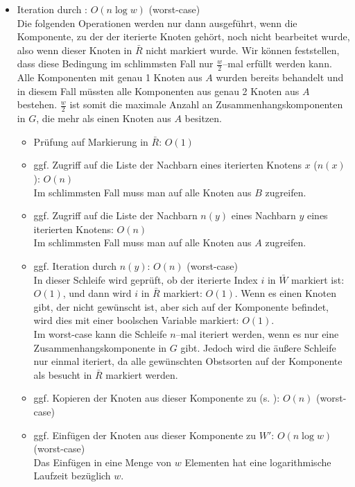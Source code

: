 \begin{itemize}
\begin{itemize}
    \item Iteration durch : $O(n \log w)$ (worst-case)\\
    Die folgenden Operationen werden nur dann ausgeführt, wenn die Komponente,
    zu der der iterierte Knoten gehört, noch nicht bearbeitet wurde, also 
    wenn dieser Knoten in $\bar{R}$ nicht markiert wurde. Wir können feststellen, 
    dass diese Bedingung im schlimmsten Fall nur $\frac{w}{2}$--mal erfüllt werden kann.
    Alle Komponenten mit genau 1 Knoten aus $A$ wurden bereits behandelt und in diesem
    Fall müssten alle Komponenten aus genau 2 Knoten aus $A$ bestehen.
    $\frac{w}{2}$ ist somit die maximale Anzahl an Zusammenhangskomponenten in $G$,
    die mehr als einen Knoten aus $A$ besitzen.
    \begin{itemize}
    \item Prüfung auf Markierung in $\bar{R}$: $O(1)$

    \item ggf. Zugriff auf die Liste der Nachbarn eines iterierten Knotens $x$ ($n(x)$): $O(n)$\\
    Im schlimmsten Fall muss man auf alle Knoten aus $B$ zugreifen.

    \item ggf. Zugriff auf die Liste der Nachbarn $n(y)$ eines Nachbarn $y$ eines iterierten Knotens: $O(n)$\\
    Im schlimmsten Fall muss man auf alle Knoten aus $A$ zugreifen.

    \item ggf. Iteration durch $n(y)$: $O(n)$ (worst-case)\\
    In dieser Schleife wird geprüft, ob der iterierte Index $i$ in $\bar{W}$ markiert ist: $O(1)$,
    und dann wird $i$ in $\bar{R}$ markiert: $O(1)$. Wenn es einen Knoten gibt, der nicht gewünscht ist,
    aber sich auf der Komponente befindet, wird dies mit einer boolschen Variable  markiert: $O(1)$.\\
    Im worst-case kann die Schleife $n$--mal iteriert werden, wenn es nur eine Zusammenhangskomponente
    in $G$ gibt. Jedoch wird die äußere Schleife nur einmal iteriert, da alle gewünschten 
    Obstsorten auf der Komponente als besucht in $\bar{R}$ markiert werden.
    \item ggf. Kopieren der Knoten aus dieser Komponente zu  (s. ): $O(n)$ (worst-case)

    \item ggf. Einfügen der Knoten aus dieser Komponente zu $W'$: $O(n \log w)$ (worst-case)\\
    Das Einfügen in eine Menge von $w$ Elementen hat eine logarithmische Laufzeit bezüglich $w$.


\end{itemize}
\end{itemize}
\end{itemize}
